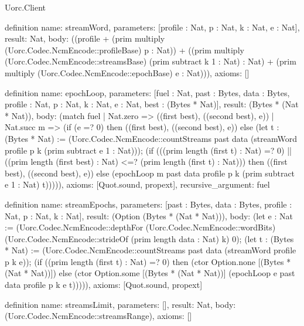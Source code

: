 \begin{lexlean}{Uorc.Client}
\begin{semanticmodule}
definition{
  name: streamWord,
  parameters: [profile : Nat, p : Nat, k : Nat, e : Nat],
  result: Nat,
  body: ((profile + (prim multiply (Uorc.Codec.NcmEncode::profileBase) p : Nat)) + ((prim multiply (Uorc.Codec.NcmEncode::streamsBase) (prim subtract k 1 : Nat) : Nat) + (prim multiply (Uorc.Codec.NcmEncode::epochBase) e : Nat))),
  axioms: []
}

definition{
  name: epochLoop,
  parameters: [fuel : Nat, past : Bytes, data : Bytes, profile : Nat, p : Nat, k : Nat, e : Nat, best : (Bytes * Nat)],
  result: (Bytes * (Nat * Nat)),
  body: (match fuel
    | Nat.zero => ((first best), ((second best), e))
    | Nat.succ m => (if (e =? 0) then ((first best), ((second best), e)) else (let t : (Bytes * Nat) := (Uorc.Codec.NcmEncode::countStreams past data (streamWord profile p k (prim subtract e 1 : Nat))); (if (((prim length (first t) : Nat) =? 0) || ((prim length (first best) : Nat) <=? (prim length (first t) : Nat))) then ((first best), ((second best), e)) else (epochLoop m past data profile p k (prim subtract e 1 : Nat) t))))),
  axioms: [Quot.sound, propext],
  recursive_argument: fuel
}

definition{
  name: streamEpochs,
  parameters: [past : Bytes, data : Bytes, profile : Nat, p : Nat, k : Nat],
  result: (Option (Bytes * (Nat * Nat))),
  body: (let e : Nat := (Uorc.Codec.NcmEncode::depthFor (Uorc.Codec.NcmEncode::wordBits) (Uorc.Codec.NcmEncode::strideOf (prim length data : Nat) k) 0); (let t : (Bytes * Nat) := (Uorc.Codec.NcmEncode::countStreams past data (streamWord profile p k e)); (if ((prim length (first t) : Nat) =? 0) then (ctor Option.none [(Bytes * (Nat * Nat))]) else (ctor Option.some [(Bytes * (Nat * Nat))] (epochLoop e past data profile p k e t))))),
  axioms: [Quot.sound, propext]
}

definition{
  name: streamsLimit,
  parameters: [],
  result: Nat,
  body: (Uorc.Codec.NcmEncode::streamsRange),
  axioms: []
}


\end{semanticmodule}
\end{lexlean}
